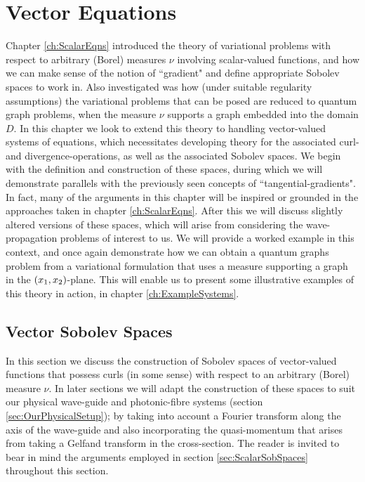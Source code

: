 \chapter{Vector Equations} \label{ch:VectorEqns}
Chapter \ref{ch:ScalarEqns} introduced the theory of variational problems with respect to arbitrary (Borel) measures $\nu$ involving scalar-valued functions, and how we can make sense of the notion of ``gradient" and define appropriate Sobolev spaces to work in.
Also investigated was how (under suitable regularity assumptions) the variational problems that can be posed are reduced to quantum graph problems, when the measure $\nu$ supports a graph embedded into the domain $D$. 
In this chapter we look to extend this theory to handling vector-valued systems of equations, which necessitates developing theory for the associated curl- and divergence-operations, as well as the associated Sobolev spaces.
We begin with the definition and construction of these spaces, during which we will demonstrate parallels with the previously seen concepts of ``tangential-gradients".
In fact, many of the arguments in this chapter will be inspired or grounded in the approaches taken in chapter \ref{ch:ScalarEqns}.
After this we will discuss slightly altered versions of these spaces, which will arise from considering the wave-propagation problems of interest to us.
We will provide a worked example in this context, and once again demonstrate how we can obtain a quantum graphs problem from a variational formulation that uses a measure supporting a graph in the $\left( x_1,x_2 \right)$-plane.
This will enable us to present some illustrative examples of this theory in action, in chapter \ref{ch:ExampleSystems}.

\section{Vector Sobolev Spaces} \label{sec:VectorSobSpaces}
In this section we discuss the construction of Sobolev spaces of vector-valued functions that possess curls (in some sense) with respect to an arbitrary (Borel) measure $\nu$.
In later sections we will adapt the construction of these spaces to suit our physical wave-guide and photonic-fibre systems (section \ref{sec:OurPhysicalSetup}); by taking into account a Fourier transform along the axis of the wave-guide and also incorporating the quasi-momentum that arises from taking a Gelfand transform in the cross-section.
The reader is invited to bear in mind the arguments employed in section \ref{sec:ScalarSobSpaces} throughout this section. \newline

